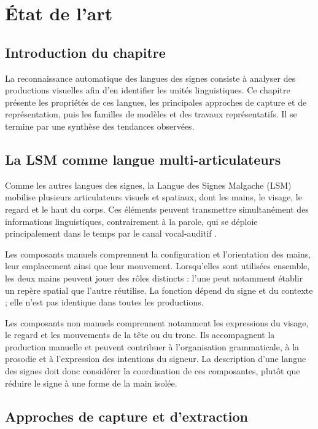 \chapter{État de l'art}

\section{Introduction du chapitre}

La reconnaissance automatique des langues des signes consiste à analyser des productions visuelles afin d'en identifier les unités linguistiques. Ce chapitre présente les propriétés de ces langues, les principales approches de capture et de représentation, puis les familles de modèles et des travaux représentatifs. Il se termine par une synthèse des tendances observées.

\section{La LSM comme langue multi-articulateurs}

Comme les autres langues des signes, la Langue des Signes Malgache (LSM) mobilise plusieurs articulateurs visuels et spatiaux, dont les mains, le visage, le regard et le haut du corps. Ces éléments peuvent transmettre simultanément des informations linguistiques, contrairement à la parole, qui se déploie principalement dans le temps par le canal vocal-auditif \cite{Sandler2006SignLanguageUniversals}.

Les composants manuels comprennent la configuration et l'orientation des mains, leur emplacement ainsi que leur mouvement. Lorsqu'elles sont utilisées ensemble, les deux mains peuvent jouer des rôles distincts : l'une peut notamment établir un repère spatial que l'autre réutilise. La fonction dépend du signe et du contexte ; elle n'est pas identique dans toutes les productions.

Les composants non manuels comprennent notamment les expressions du visage, le regard et les mouvements de la tête ou du tronc. Ils accompagnent la production manuelle et peuvent contribuer à l'organisation grammaticale, à la prosodie et à l'expression des intentions du signeur. La description d'une langue des signes doit donc considérer la coordination de ces composantes, plutôt que réduire le signe à une forme de la main isolée.

\section{Approches de capture et d'extraction}

